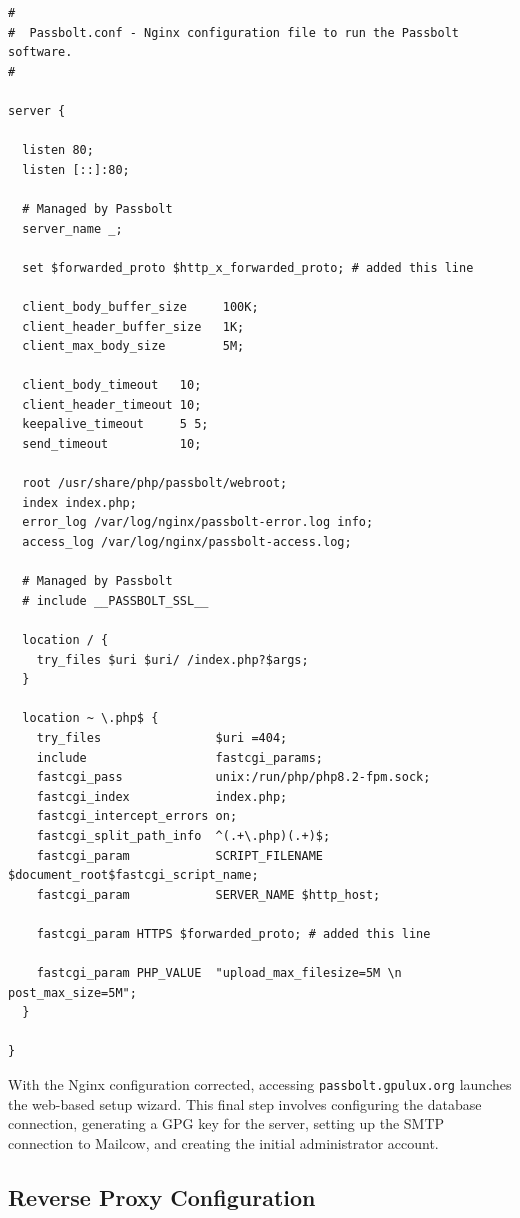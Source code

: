 \begin{lstlisting}[caption={Modified Passbolt Nginx configuration to work behind a reverse proxy.}]
#
#  Passbolt.conf - Nginx configuration file to run the Passbolt software.
#

server {

  listen 80;
  listen [::]:80;

  # Managed by Passbolt
  server_name _;

  set $forwarded_proto $http_x_forwarded_proto; # added this line

  client_body_buffer_size     100K;
  client_header_buffer_size   1K;
  client_max_body_size        5M;

  client_body_timeout   10;
  client_header_timeout 10;
  keepalive_timeout     5 5;
  send_timeout          10;

  root /usr/share/php/passbolt/webroot;
  index index.php;
  error_log /var/log/nginx/passbolt-error.log info;
  access_log /var/log/nginx/passbolt-access.log;

  # Managed by Passbolt
  # include __PASSBOLT_SSL__

  location / {
    try_files $uri $uri/ /index.php?$args;
  }

  location ~ \.php$ {
    try_files                $uri =404;
    include                  fastcgi_params;
    fastcgi_pass             unix:/run/php/php8.2-fpm.sock;
    fastcgi_index            index.php;
    fastcgi_intercept_errors on;
    fastcgi_split_path_info  ^(.+\.php)(.+)$;
    fastcgi_param            SCRIPT_FILENAME $document_root$fastcgi_script_name;
    fastcgi_param            SERVER_NAME $http_host;

    fastcgi_param HTTPS $forwarded_proto; # added this line

    fastcgi_param PHP_VALUE  "upload_max_filesize=5M \n post_max_size=5M";
  }

}
\end{lstlisting}

With the Nginx configuration corrected, accessing \texttt{passbolt.gpulux.org} launches the web-based setup wizard. This final step involves configuring the database connection, generating a GPG key for the server, setting up the SMTP connection to Mailcow, and creating the initial administrator account.

\subsection*{Reverse Proxy Configuration}

